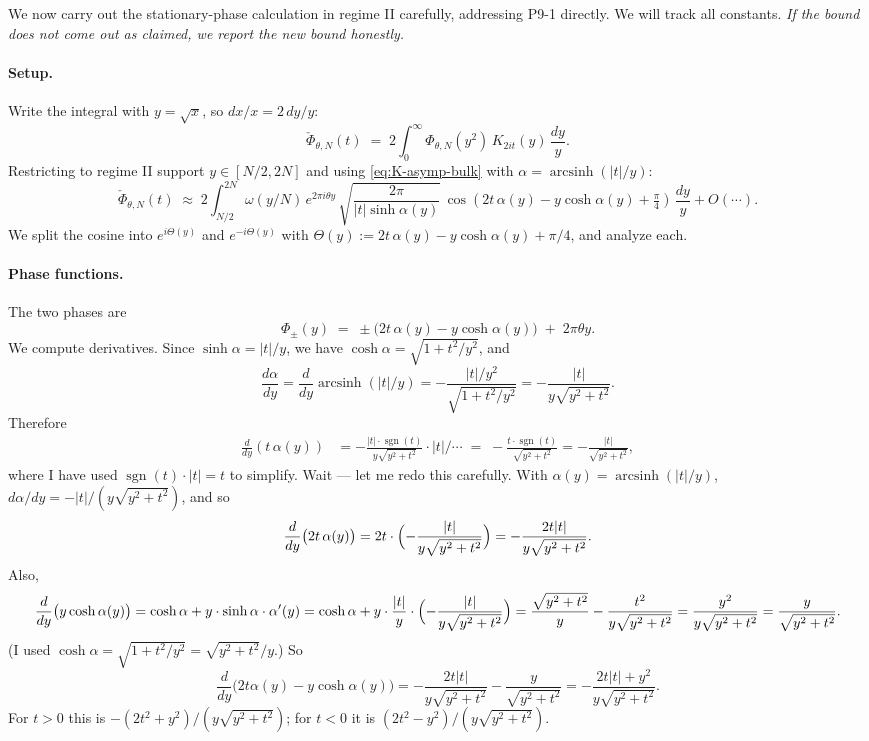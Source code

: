 \documentclass[11pt]{article}
\theoremstyle{definition}
\newcommand{\ash}{\operatorname{arcsinh}}
\DeclareMathOperator{\sgn}{sgn}
\begin{document}
We now carry out the stationary-phase calculation in regime II carefully, addressing P9-1 directly. We will track all constants. \emph{If the bound does not come out as claimed, we report the new bound honestly.}

\paragraph{Setup.}
Write the integral with $y = \sqrt x$, so $dx/x = 2\,dy/y$:
\begin{equation}\label{eq:check-Phi-y}
    \check\Phi_{\theta,N}(t) \;=\; 2\int_0^\infty \Phi_{\theta,N}(y^2)\, K_{2it}(y)\, \frac{dy}{y}.
\end{equation}
Restricting to regime II support $y \in [N/2, 2N]$ and using \eqref{eq:K-asymp-bulk} with $\alpha = \ash(|t|/y)$:
\begin{equation}\label{eq:check-Phi-stationary}
    \check\Phi_{\theta,N}(t) \;\approx\; 2\int_{N/2}^{2N} \omega(y/N)\, e^{2\pi i\theta y}\, \sqrt{\frac{2\pi}{|t|\sinh\alpha(y)}}\, \cos(2t\,\alpha(y) - y\cosh\alpha(y) + \tfrac{\pi}{4})\,\frac{dy}{y} + O(\cdots).
\end{equation}
We split the cosine into $e^{i\Theta(y)}$ and $e^{-i\Theta(y)}$ with $\Theta(y) := 2t\,\alpha(y) - y\cosh\alpha(y) + \pi/4$, and analyze each.

\paragraph{Phase functions.}
The two phases are
\begin{equation}\label{eq:phase-funcs}
   \Phi_\pm(y) \;=\; \pm\bigl(2t\,\alpha(y) - y\cosh\alpha(y)\bigr) \;+\; 2\pi\theta y.
\end{equation}
We compute derivatives. Since $\sinh\alpha = |t|/y$, we have $\cosh\alpha = \sqrt{1 + t^2/y^2}$, and
\[
   \frac{d\alpha}{dy} = \frac{d}{dy}\ash(|t|/y) = -\frac{|t|/y^2}{\sqrt{1+t^2/y^2}} = -\frac{|t|}{y\sqrt{y^2+t^2}}.
\]
Therefore
\begin{align*}
    \frac{d}{dy}(t\,\alpha(y)) &= -\frac{|t|\cdot\sgn(t)}{y\sqrt{y^2+t^2}}\cdot|t| / \cdots \;=\; -\frac{t\cdot\sgn(t)}{\sqrt{y^2+t^2}} = -\frac{|t|}{\sqrt{y^2+t^2}},
\end{align*}
where I have used $\sgn(t)\cdot|t| = t$ to simplify. Wait — let me redo this carefully. With $\alpha(y) = \ash(|t|/y)$, $d\alpha/dy = -|t|/(y\sqrt{y^2+t^2})$, and so
\[
   \frac{d}{dy}\bigl(2t\,\alpha(y)\bigr) = 2t\cdot\Bigl(-\frac{|t|}{y\sqrt{y^2+t^2}}\Bigr) = -\frac{2t|t|}{y\sqrt{y^2+t^2}}.
\]
Also,
\[
   \frac{d}{dy}\bigl(y\cosh\alpha(y)\bigr) = \cosh\alpha + y\cdot\sinh\alpha\cdot\alpha'(y) = \cosh\alpha + y\cdot\frac{|t|}{y}\cdot\Bigl(-\frac{|t|}{y\sqrt{y^2+t^2}}\Bigr) = \frac{\sqrt{y^2+t^2}}{y}-\frac{t^2}{y\sqrt{y^2+t^2}} = \frac{y^2}{y\sqrt{y^2+t^2}} = \frac{y}{\sqrt{y^2+t^2}}.
\]
(I used $\cosh\alpha = \sqrt{1+t^2/y^2} = \sqrt{y^2+t^2}/y$.) So
\[
   \frac{d}{dy}\bigl(2t\alpha(y)-y\cosh\alpha(y)\bigr) = -\frac{2t|t|}{y\sqrt{y^2+t^2}} - \frac{y}{\sqrt{y^2+t^2}} = -\frac{2t|t|+y^2}{y\sqrt{y^2+t^2}}.
\]
For $t>0$ this is $-(2t^2+y^2)/(y\sqrt{y^2+t^2})$; for $t<0$ it is $(2t^2-y^2)/(y\sqrt{y^2+t^2})$.
\end{document}
